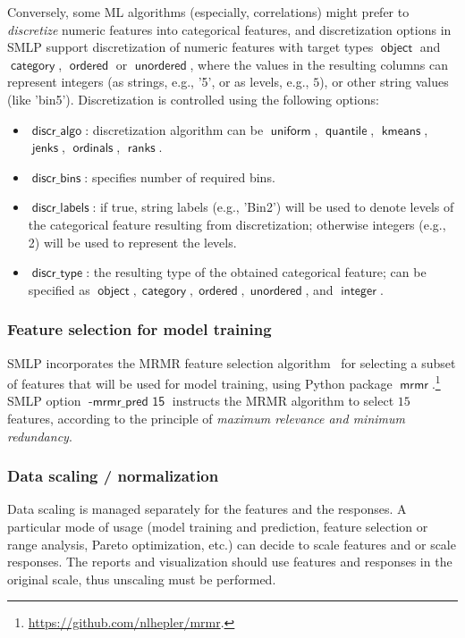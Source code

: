 \documentclass[a4paper,parskip=half]{article} %
\newcommand*\option[1]{\operatorname{\mathsf{#1}}} %
\newcommand*\package[1]{\operatorname{\mathsf{#1}}} %
\newcommand*\dtype[1]{\operatorname{\mathsf{#1}}} %
\begin{document}
Conversely, some ML algorithms (especially, correlations)
might prefer to \emph{discretize} numeric features into categorical features, and discretization options
in SMLP support discretization of numeric features with target types $\dtype{object}$ and $\dtype{category}$, 
 $\dtype{ordered}$ or  $\dtype{unordered}$, where the values in the resulting columns can represent integers 
(as strings,  e.g.,  '5', or as levels, e.g., $5$), or other string values (like 'bin5'). Discretization is controlled
using the following options: 
\begin{itemize}
\item $\option{discr\_algo}$: discretization algorithm can be $\option{uniform}$, $\option{quantile}$, 
$\option{kmeans}$, $\option{jenks}$, $\option{ordinals}$, $\option{ranks}$.
\item $\option{discr\_bins}$: specifies number of required bins.
\item $\option{discr\_labels}$: if true, string labels (e.g., 'Bin2') will be used to denote levels of the categorical feature
resulting from discretization; otherwise integers (e.g., 2) will be used to represent the levels.
\item $\option{discr\_type}$: the resulting type of the obtained categorical feature; can be specified as 
$\dtype{object}, \dtype{category}, \dtype{ordered}, \dtype{unordered}$, and $\dtype{integer}$.
\end{itemize}


\subsubsection{Feature selection for model training}\label{sec:mrmr:pred}

SMLP incorporates the MRMR feature selection algorithm~\cite{DBLP:journals/jbcb/DingP05} 
for selecting a subset of features that will be used for model training, using Python package 
$\package{mrmr}.$\footnote{\url{https://github.com/nlhepler/mrmr}.}
SMLP option $\option{-mrmr\_pred\,\,15}$ instructs the MRMR algorithm to select $15$ features, 
according to the principle of \emph{maximum relevance and minimum redundancy}.

\subsubsection{Data scaling / normalization}

Data scaling is managed separately for the features and the responses. A particular mode of usage
(model training and prediction, feature selection or range analysis, Pareto optimization, etc.)
can decide to scale features and or scale responses. The reports and visualization should use
features and responses in the original scale, thus unscaling must be performed. 
\end{document}
